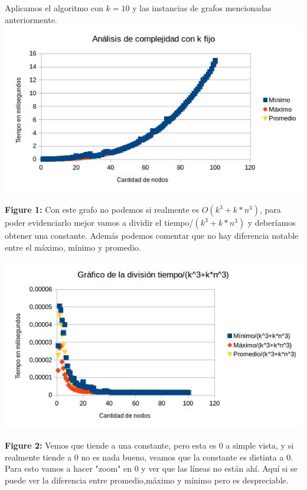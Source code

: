 \documentclass[a4paper]{article}
\begin{document}
Aplicamos el algoritmo con $k=10$ y las instancias de grafos mencionadas anteriormente.\newline
\includegraphics[width=\textwidth,height=\textheight,keepaspectratio
]{local2Kfijo.jpg}
\begin {flushleft}
\textbf{Figure 1:} Con este grafo no podemos si realmente es $O(k^{3}+k*n^{3})$, para poder evidenciarlo mejor vamos a dividir el tiempo/$(k^{3}+k*n^{3})$ y deberíamos obtener una constante. \newline
Además podemos comentar que no hay diferencia notable entre el máximo, mínimo y promedio.
\end{flushleft}

\includegraphics[width=\textwidth,height=\textheight,keepaspectratio
]{local2KfijoConstante.jpg}
\begin {flushleft}
\textbf{Figure 2:} Vemos que tiende a una constante, pero esta es 0 a simple vista, y si realmente tiende a 0 no es nada bueno, veamos que la constante es distinta a 0. Para esto vamos a hacer "zoom" en 0 y ver que las líneas no están ahí.\newline
Aquí si se puede ver la diferencia entre promedio,máximo y mínimo pero es despreciable.
\end{flushleft}
\end{document}
